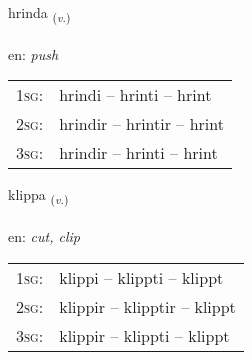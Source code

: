 \documentclass[frontgrid, backgrid]{flacards}\usepackage[]{graphicx}\usepackage[]{xcolor}
\begin{document}
\renewcommand{\flhead}{\vskip5pt \fboxsep=0pt {\small\bfseries\footnotesize Sagnorð | Verb}}
\renewcommand{\fcfoot}{\vskip5pt \fboxsep=0pt \hspace{2pt}{\small\bfseries\footnotesize 3K}}

\renewcommand{\blhead}{\vskip5pt {\small\bfseries\footnotesize Sagnorð | Verb }}
\renewcommand{\bcfoot}{\vskip5pt \hspace{2pt}{\small\bfseries\footnotesize 3K}}


{hrinda \small{\textsubscript{(\textit{v.})}} \\[1ex] %
\textphonetic{[r̥ɪnta]} \\
en: \emph{push} \\  [2ex]
\renewcommand*{\arraystretch}{0.8}
\begin{tabular}{p{1cm}l}
\textsc{1sg}: & hrindi -- hrinti -- hrint \\ 
\textsc{2sg}: & hrindir -- hrintir -- hrint \\ 
\textsc{3sg}: & hrindir -- hrinti -- hrint \\ 
\end{tabular}
}

\renewcommand{\flhead}{\vskip5pt \fboxsep=0pt {\small\bfseries\footnotesize Sagnorð | Verb}}
\renewcommand{\fcfoot}{\vskip5pt \fboxsep=0pt \hspace{2pt}{\small\bfseries\footnotesize 3K}}

\renewcommand{\blhead}{\vskip5pt {\small\bfseries\footnotesize Sagnorð | Verb }}
\renewcommand{\bcfoot}{\vskip5pt \hspace{2pt}{\small\bfseries\footnotesize 3K}}


{klippa \small{\textsubscript{(\textit{v.})}} \\[1ex] %
\textphonetic{[kʰlɪhpa]} \\
en: \emph{cut, clip} \\  [2ex]
\renewcommand*{\arraystretch}{0.8}
\begin{tabular}{p{1cm}l}
\textsc{1sg}: & klippi -- klippti -- klippt \\ 
\textsc{2sg}: & klippir -- klipptir -- klippt \\ 
\textsc{3sg}: & klippir -- klippti -- klippt \\ 
\end{tabular}
}
\end{document}
